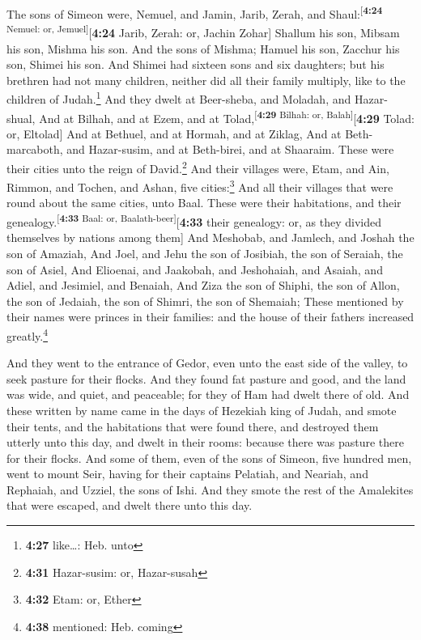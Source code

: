  The sons of Simeon were, Nemuel, and Jamin, Jarib,
Zerah, and Shaul:\textsuperscript{{[}\textbf{4:24} Nemuel: or,
Jemuel{]}}{[}\textbf{4:24} Jarib, Zerah: or, Jachin Zohar{]}
 Shallum his son, Mibsam his son, Mishma his son.
 And the sons of Mishma; Hamuel his son, Zacchur his son,
Shimei his son.  And Shimei had sixteen sons and six
daughters; but his brethren had not many children, neither did all their
family multiply, like to the children of Judah.\footnote{\textbf{4:27}
  like\ldots: Heb. unto}  And they dwelt at Beer-sheba,
and Moladah, and Hazar-shual,  And at Bilhah, and at
Ezem, and at Tolad,\textsuperscript{{[}\textbf{4:29} Bilhah: or,
Balah{]}}{[}\textbf{4:29} Tolad: or, Eltolad{]}  And at
Bethuel, and at Hormah, and at Ziklag,  And at
Beth-marcaboth, and Hazar-susim, and at Beth-birei, and at Shaaraim.
These were their cities unto the reign of David.\footnote{\textbf{4:31}
  Hazar-susim: or, Hazar-susah}  And their villages were,
Etam, and Ain, Rimmon, and Tochen, and Ashan, five cities:\footnote{\textbf{4:32}
  Etam: or, Ether}  And all their villages that were
round about the same cities, unto Baal. These were their habitations,
and their genealogy.\textsuperscript{{[}\textbf{4:33} Baal: or,
Baalath-beer{]}}{[}\textbf{4:33} their genealogy: or, as they divided
themselves by nations among them{]}  And Meshobab, and
Jamlech, and Joshah the son of Amaziah,  And Joel, and
Jehu the son of Josibiah, the son of Seraiah, the son of Asiel,
 And Elioenai, and Jaakobah, and Jeshohaiah, and Asaiah,
and Adiel, and Jesimiel, and Benaiah,  And Ziza the son
of Shiphi, the son of Allon, the son of Jedaiah, the son of Shimri, the
son of Shemaiah;  These mentioned by their names were
princes in their families: and the house of their fathers increased
greatly.\footnote{\textbf{4:38} mentioned: Heb. coming}

 And they went to the entrance of Gedor, even unto the
east side of the valley, to seek pasture for their flocks.
 And they found fat pasture and good, and the land was
wide, and quiet, and peaceable; for they of Ham had dwelt there of old.
 And these written by name came in the days of Hezekiah
king of Judah, and smote their tents, and the habitations that were
found there, and destroyed them utterly unto this day, and dwelt in
their rooms: because there was pasture there for their flocks.
 And some of them, even of the sons of Simeon, five
hundred men, went to mount Seir, having for their captains Pelatiah, and
Neariah, and Rephaiah, and Uzziel, the sons of Ishi.  And
they smote the rest of the Amalekites that were escaped, and dwelt there
unto this day.

